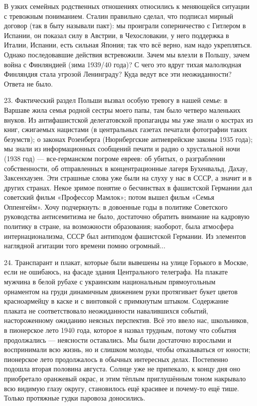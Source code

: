 В узких семейных родственных отношениях относились к меняющейся ситуации с тревожным пониманием. Сталин правильно сделал, что подписал мирный договор (так в быту называли пакт): мы проиграли соперничество с Гитлером в Испании, он показал силу в Австрии, в Чехословакии, у него поддержка в Италии, Испании, есть сильная Япония; так что всё верно, нам надо укрепляться. Однако последовавшие действия встревожили. Зачем мы влезли в Польшу, зачем война с Финляндией (зима 1939/40 года)? С чего это вдруг тихая малолюдная Финляндия стала угрозой Ленинграду? Куда ведут все эти неожиданности? Ответа не было.

23. Фактический раздел Польши вызвал особую тревогу в нашей семье: в Варшаве жила семья родной сестры моего папы, там было четверо маленьких внуков. Из антифашистской делегатовской пропаганды мы уже знали о кострах из книг, сжигаемых нацистами (в центральных газетах печатали фотографии таких безумств); о законах Розенберга (Нюрнбергские антиеврейские законы 1935 года); мы знали из информационных сообщений печати и радио о хрустальной ночи (1938 год) — все-германском погроме евреев: об убитых, о разграблении собственности, об отправленных в концентрационные лагеря Бухенвальд, Дахау, Заксенхаузен. Эти страшные слова уже были на слуху у нас в СССР, а значит и в других странах. Некое зримое понятие о бесчинствах в фашистской Германии дал советский фильм «Профессор Мамлок»; потом вышел фильм «Семья Оппенгейм». Хочу подчеркнуть: в довоенные годы в политике Советского руководства антисемитизма не было, достаточно обратить внимание на кадровую политику в стране, на возможности образования; наоборот, была атмосфера интернационализма, СССР был антиподом фашистской Германии. Из элементов наглядной агитации того времени помню огромный...

24. Транспарант и плакат, которые были вывешены на улице Горького в Москве, если не ошибаюсь, на фасаде здания Центрального телеграфа. На плакате мужчина в белой рубахе с украинским национальным прямоугольным орнаментом на груди динамичным движением руки протягивает букет цветов красноармейцу в каске и с винтовкой с примкнутым штыком. Содержание плаката не соответствовало неожиданности навалившихся событий, настороженному ожиданию неясных перспектив. Всё это ввело нас, школьников, в пионерское лето 1940 года, которое я назвал трудным, потому что события продолжались — неясности оставались. Мы были достаточно взрослыми и воспринимали всю жизнь, но и слишком молоды, чтобы отказываться от юности; пионерское лето продолжалось в обычных интересных делах. Постепенно подошла вторая половина августа. Солнце уже не припекало, к концу дня оно приобретало оранжевый окрас, и этим тёплым приглушённым тоном накрывало всю видимую глазу округу, становилось ещё красивее и почему-то ещё тише. Только протяжные гудки паровоза доносились.

